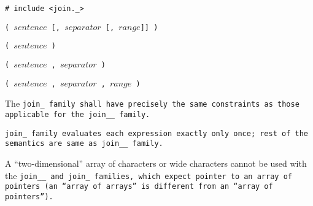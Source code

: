 
\tt{# include <join._>}

\s\s\s\tt{(} $sentence$
[\tt{,} $separator$ [\tt{,} $range$]] \tt{)}

\s\tt{(} $sentence$ \tt{)}

\s\tt{(} $sentence$
\phantom{[}\tt{,} $separator$\phantom{]} \tt{)}

\s\tt{(} $sentence$
\phantom{[}\tt{,} $separator$ \phantom{[}\tt{,} $range$\phantom{]]} \tt{)}


The \tt{join_} family shall have precisely the same
constraints as those applicable for the \tt{join__} family.


\tt{join_} family evaluates each expression exactly only once;
rest of the semantics are same as \tt{join__} family.

\note A ``two-dimensional'' array of characters or wide
characters cannot be used with the \tt{join__} and \tt{join_}
families, which expect pointer to an array of pointers
(an ``array of arrays'' is different from an ``array of pointers'').
